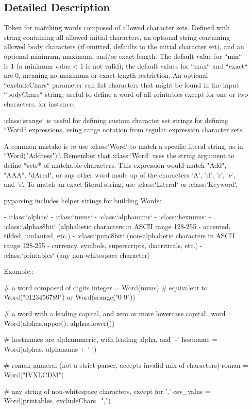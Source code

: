 \subsection{Detailed Description}
\begin{DoxyVerb}Token for matching words composed of allowed character sets.
Defined with string containing all allowed initial characters, an
optional string containing allowed body characters (if omitted,
defaults to the initial character set), and an optional minimum,
maximum, and/or exact length.  The default value for ``min`` is
1 (a minimum value < 1 is not valid); the default values for
``max`` and ``exact`` are 0, meaning no maximum or exact
length restriction. An optional ``excludeChars`` parameter can
list characters that might be found in the input ``bodyChars``
string; useful to define a word of all printables except for one or
two characters, for instance.

:class:`srange` is useful for defining custom character set strings
for defining ``Word`` expressions, using range notation from
regular expression character sets.

A common mistake is to use :class:`Word` to match a specific literal
string, as in ``Word("Address")``. Remember that :class:`Word`
uses the string argument to define *sets* of matchable characters.
This expression would match "Add", "AAA", "dAred", or any other word
made up of the characters 'A', 'd', 'r', 'e', and 's'. To match an
exact literal string, use :class:`Literal` or :class:`Keyword`.

pyparsing includes helper strings for building Words:

 - :class:`alphas`
 - :class:`nums`
 - :class:`alphanums`
 - :class:`hexnums`
 - :class:`alphas8bit` (alphabetic characters in ASCII range 128-255
   - accented, tilded, umlauted, etc.)
 - :class:`punc8bit` (non-alphabetic characters in ASCII range
   128-255 - currency, symbols, superscripts, diacriticals, etc.)
 - :class:`printables` (any non-whitespace character)

Example::

    # a word composed of digits
    integer = Word(nums) # equivalent to Word("0123456789") or Word(srange("0-9"))

    # a word with a leading capital, and zero or more lowercase
    capital_word = Word(alphas.upper(), alphas.lower())

    # hostnames are alphanumeric, with leading alpha, and '-'
    hostname = Word(alphas, alphanums + '-')

    # roman numeral (not a strict parser, accepts invalid mix of characters)
    roman = Word("IVXLCDM")

    # any string of non-whitespace characters, except for ','
    csv_value = Word(printables, excludeChars=",")
\end{DoxyVerb}
 

